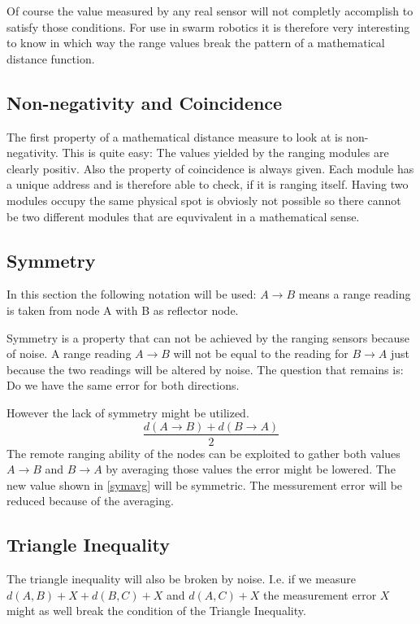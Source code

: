 Of course the value measured by any real sensor will not completly accomplish to satisfy those conditions.
For use in swarm robotics it is therefore very interesting to know in which way the range values break the pattern of a mathematical distance function.

\subsection{Non-negativity and Coincidence}

The first property of a mathematical distance measure to look at is non-negativity. This is quite easy: The values yielded by the ranging modules are clearly positiv.
Also the property of coincidence is always given.
Each module has a unique address and is therefore able to check, if it is ranging itself.
Having two modules occupy the same physical spot is obviosly not possible so there cannot be two different modules that are equvivalent in a mathematical sense.

\subsection{Symmetry}

In this section the following notation will be used: $A \rightarrow B$ means a range reading is taken from node A with B as reflector node.

Symmetry is a property that can not be achieved by the ranging sensors because of noise. 
A range reading $A \rightarrow B$ will not be equal to the reading for $B \rightarrow A$ just because the two readings will be altered by noise.
The question that remains is: Do we have the same error for both directions.



However the lack of symmetry might be utilized.
\begin{equation}
\frac{ d(A \rightarrow B) + d(B \rightarrow A) }{2}
\label{symavg}
\end{equation}
The remote ranging ability of the nodes can be exploited to gather both values $A \rightarrow B$ and $B \rightarrow A$ by averaging those values the error might be lowered. 
The new value shown in \autoref{symavg} will be symmetric.
The messurement error will be reduced because of the averaging.

\subsection{Triangle Inequality}
The triangle inequality will also be broken by noise.
I.e. if we measure $d(A,B) + X + d(B,C) + X$ and $d(A, C) + X$ the measurement error $X$ might as well break the condition of the Triangle Inequality.

